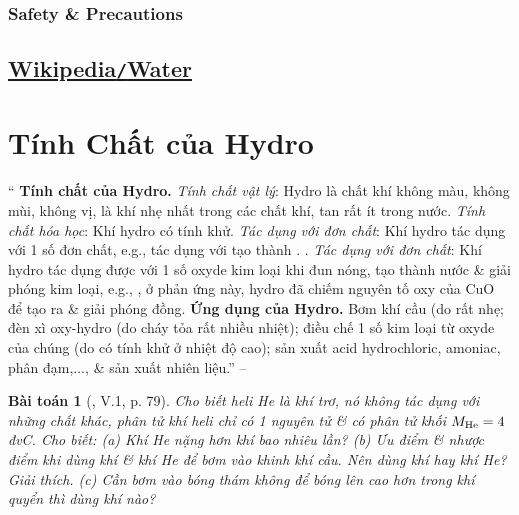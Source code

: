 \documentclass{article}
\newtheorem{baitoan}{Bài toán}
\begin{document}
\subsubsection{Safety \& Precautions}


\subsection{\href{https://en.wikipedia.org/wiki/Water}{Wikipedia\texttt{/}Water}}


\section{Tính Chất của Hydro}
`` \textbf{Tính chất của Hydro.} \textit{Tính chất vật lý}: Hydro là chất khí không màu, không mùi, không vị, là khí nhẹ nhất trong các chất khí, tan rất ít trong nước. \textit{Tính chất hóa học}: Khí hydro có tính khử. \textit{Tác dụng với đơn chất}: Khí hydro tác dụng với 1 số đơn chất, e.g.,  tác dụng với  tạo thành . . \textit{Tác dụng với đơn chất}: Khí hydro tác dụng được với 1 số oxyde kim loại khi đun nóng, tạo thành nước \& giải phóng kim loại, e.g., , ở phản ứng này, hydro đã chiếm nguyên tố oxy của CuO để tạo ra  \& giải phóng đồng.  \textbf{Ứng dụng của Hydro.} Bơm khí cầu (do rất nhẹ; đèn xì oxy-hydro (do cháy tỏa rất nhiều nhiệt); điều chế 1 số kim loại từ oxyde của chúng (do có tính khử ở nhiệt độ cao); sản xuất acid hydrochloric, amoniac, phân đạm,$\ldots$, \& sản xuất nhiên liệu.'' -- \cite[Chap. 5, \S1, pp. 78--79]{Truong_BTNC_Hoa_Hoc_8_2022}

\begin{baitoan}[\cite{Truong_BTNC_Hoa_Hoc_8_2022}, V.1, p. 79]
	Cho biết heli \emph{He} là khí trơ, nó không tác dụng với những chất khác, phân tử khí heli chỉ có 1 nguyên tử \& có phân tử khối $M_{\rm He} = 4$đvC. Cho biết: (a) Khí \emph{He} nặng hơn khí \emph{} bao nhiêu lần? (b) Ưu điểm \& nhược điểm khi dùng khí \emph{} \& khí \emph{He} để bơm vào khinh khí cầu. Nên dùng khí \emph{} hay khí \emph{He}? Giải thích. (c) Cần bơm vào bóng thám không để bóng lên cao hơn trong khí quyển thì dùng khí nào?
\end{baitoan}
\end{document}
